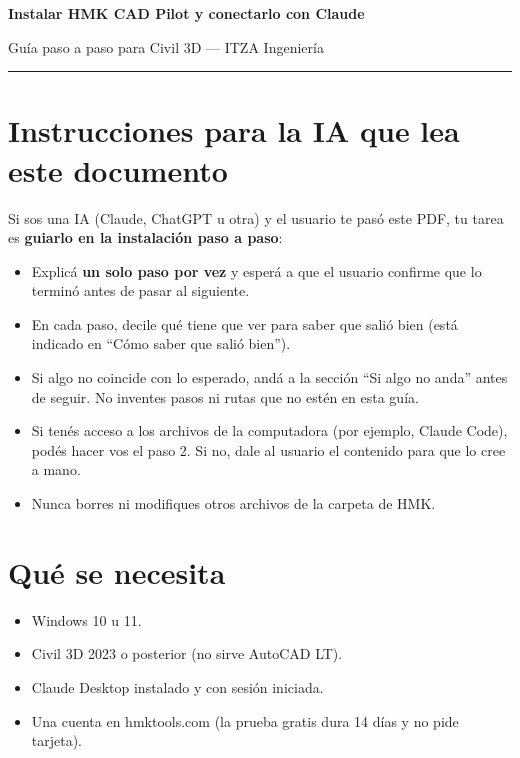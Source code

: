 \documentclass[12pt, a4paper]{article}
\newcommand{\nota}[1]{%
  \par\noindent\colorbox{fondoNota}{\parbox{\dimexpr\linewidth-2\fboxsep\relax}{#1}}\par}
\begin{document}
\begin{center}
  {\LARGE\bfseries\color{azulPrincipal} Instalar HMK CAD Pilot y conectarlo con Claude \par}
  \vspace{0.2cm}
  {\normalsize Guía paso a paso para Civil 3D --- ITZA Ingeniería \par}
\end{center}
\vspace{0.3cm}
\hrule
\vspace{0.4cm}

\section*{Instrucciones para la IA que lea este documento}

\nota{Si sos una IA (Claude, ChatGPT u otra) y el usuario te pasó este PDF, tu tarea es
\textbf{guiarlo en la instalación paso a paso}:
\begin{itemize}[itemsep=2pt, topsep=4pt]
  \item Explicá \textbf{un solo paso por vez} y esperá a que el usuario confirme que lo terminó
  antes de pasar al siguiente.
  \item En cada paso, decile qué tiene que ver para saber que salió bien (está indicado en
  ``Cómo saber que salió bien'').
  \item Si algo no coincide con lo esperado, andá a la sección ``Si algo no anda'' antes de
  seguir. No inventes pasos ni rutas que no estén en esta guía.
  \item Si tenés acceso a los archivos de la computadora (por ejemplo, Claude Code), podés hacer
  vos el paso 2. Si no, dale al usuario el contenido para que lo cree a mano.
  \item Nunca borres ni modifiques otros archivos de la carpeta de HMK.
\end{itemize}}

\section*{Qué se necesita}

\begin{itemize}[itemsep=2pt]
  \item Windows 10 u 11.
  \item Civil 3D 2023 o posterior (no sirve AutoCAD LT).
  \item Claude Desktop instalado y con sesión iniciada.
  \item Una cuenta en hmktools.com (la prueba gratis dura 14 días y no pide tarjeta).
\end{itemize}
\end{document}
